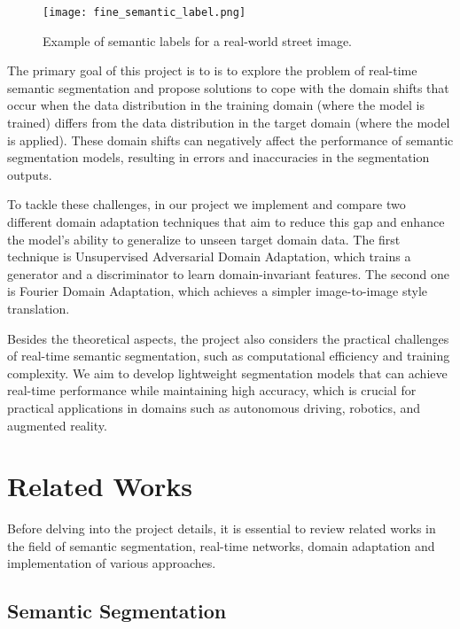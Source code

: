 \documentclass[10pt,twocolumn,letterpaper]{article}
\begin{document}
\begin{figure}[h]
    \centering
    \texttt{[image: fine\_semantic\_label.png]}
    \caption{Example of semantic labels for a real-world street image.}
    \label{fig:fine_semantic_label}
\end{figure}

The primary goal of this project is to is to explore the problem of real-time semantic segmentation and propose solutions to cope with the domain shifts that occur when the data distribution in the training domain (where the model is trained) differs from the data distribution in the target domain (where the model is applied). These domain shifts can negatively affect the performance of semantic segmentation models, resulting in errors and inaccuracies in the segmentation outputs.

To tackle these challenges, in our project we implement and compare two different domain adaptation techniques that aim to reduce this gap and enhance the model’s ability to generalize to unseen target domain data. The first technique is Unsupervised Adversarial Domain Adaptation, which trains a generator and a discriminator to learn domain-invariant features. The second one is Fourier Domain Adaptation, which achieves a simpler image-to-image style translation.

Besides the theoretical aspects, the project also considers the practical challenges of real-time semantic segmentation, such as computational efficiency and training complexity. We aim to develop lightweight segmentation models that can achieve real-time performance while maintaining high accuracy, which is crucial for practical applications in domains such as autonomous driving, robotics, and augmented reality.


\section{Related Works }

Before delving into the project details, it is essential to review related works in the field of semantic segmentation, real-time networks, domain adaptation and implementation of various approaches.

\subsection{Semantic Segmentation}
\end{document}
